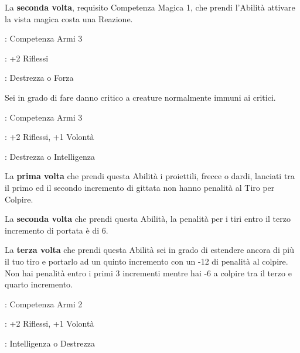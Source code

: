 \begin{multicols}{2}
La \textbf{seconda volta}, requisito Competenza Magica 1, che prendi l'Abilità attivare la vista magica costa una Reazione.

\begin{description}[noitemsep, topsep=0pt, parsep=0pt, partopsep=0pt, leftmargin=0cm, labelwidth=2.5cm]
    \item[\textbf{Requisito}]: Competenza Armi 3
    \item[\textbf{Tiri Salvezza}]: +2 Riflessi
    \item[\textbf{Caratteristica}]: Destrezza o Forza
\end{description}

Sei in grado di fare danno critico a creature normalmente immuni ai critici.

\begin{description}[noitemsep, topsep=0pt, parsep=0pt, partopsep=0pt, leftmargin=0cm, labelwidth=2.5cm]
    \item[\textbf{Requisito}]: Competenza Armi 3
    \item[\textbf{Tiri Salvezza}]: +2 Riflessi, +1 Volontà
    \item[\textbf{Caratteristica}]: Destrezza o Intelligenza
\end{description}

La \textbf{prima volta} che prendi questa Abilità i proiettili, frecce o dardi, lanciati tra il primo ed il secondo incremento di gittata non hanno penalità al Tiro per Colpire.

La \textbf{seconda volta} che prendi questa Abilità, la penalità per i tiri entro il terzo incremento di portata è di 6.

La \textbf{terza volta} che prendi questa Abilità sei in grado di estendere ancora di più il tuo tiro e portarlo ad un quinto incremento con un -12 di penalità al colpire. Non hai penalità entro i primi 3 incrementi mentre hai -6 a colpire tra il terzo e quarto incremento.

\begin{description}[noitemsep, topsep=0pt, parsep=0pt, partopsep=0pt, leftmargin=0cm, labelwidth=2.5cm]
    \item[\textbf{Requisito}]: Competenza Armi 2
    \item[\textbf{Tiri Salvezza}]: +2 Riflessi, +1 Volontà
    \item[\textbf{Caratteristica}]: Intelligenza o Destrezza
\end{description}


\end{multicols}
